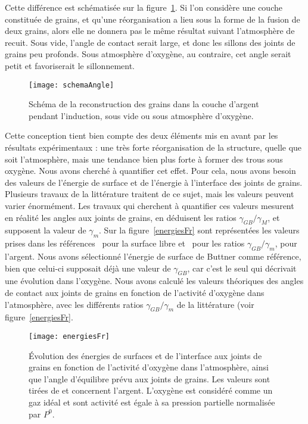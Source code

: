 {Cette différence est schématisée sur la figure~\ref{schemaAngle}. Si l’on considère une couche constituée de grains, et qu’une réorganisation a lieu sous la forme de la fusion de deux grains, alors elle ne donnera pas le même résultat suivant l’atmosphère de recuit. Sous vide, l’angle de contact serait large, et donc les sillons des joints de grains peu profonds. Sous atmosphère d’oxygène, au contraire, cet angle serait petit et favoriserait le sillonnement.\par 
\begin{figure}[!htb]
\centering
\texttt{[image: schemaAngle]}
\caption{Schéma de la reconstruction des grains dans la couche d’argent pendant l’induction, sous vide ou sous atmosphère d’oxygène.}
\label{schemaAngle}
\end{figure}
Cette conception tient bien compte des deux éléments mis en avant par les résultats expérimentaux : une très forte réorganisation de la structure, quelle que soit l’atmosphère, mais une tendance bien plus forte à former des trous sous oxygène. Nous avons cherché à quantifier cet effet. Pour cela, nous avons besoin des valeurs de l’énergie de surface et de l’énergie à l’interface des joints de grains. Plusieurs travaux de la littérature traitent de ce sujet, mais les valeurs peuvent varier énormément. Les travaux qui cherchent à quantifier ces valeurs mesurent en réalité les angles aux joints de grains, en déduisent les ratios $\gamma_{GB}/\gamma_M$, et supposent la valeur de $\gamma_m$. Sur la figure~\ref{energiesFr} sont représentées les valeurs prises dans les références~\cite{buttner1952adsorption} pour la surface libre et~\cite{inman1963interfacial, fiala1975surface, kudrman1969relative} pour les ratios  $\gamma_{GB}/\gamma_m$, pour l’argent. Nous avons sélectionné l’énergie de surface de Buttner comme référence, bien que celui-ci supposait déjà une valeur de $\gamma_{GB}$, car c’est le seul qui décrivait une évolution dans l’oxygène. Nous avons calculé les valeurs théoriques des angles de contact aux joints de grains en fonction de l’activité d’oxygène dans l’atmosphère, avec les différents ratios $\gamma_{GB}/\gamma_m$ de la littérature (voir figure~\ref{energiesFr}.\par 
\begin{figure}[!htb]
\centering
\texttt{[image: energiesFr]}
\caption{Évolution des énergies de surfaces et de l’interface aux joints de grains en fonction de l’activité d’oxygène dans l’atmosphère, ainsi que l’angle d’équilibre prévu aux joints de grains. Les valeurs sont tirées de \cite{buttner1952adsorption, inman1963interfacial, fiala1975surface, kudrman1969relative} et concernent l’argent. L'oxygène est considéré comme un gaz idéal et sont activité est égale à sa pression partielle normalisée par $P^0$.}

\end{figure}}
